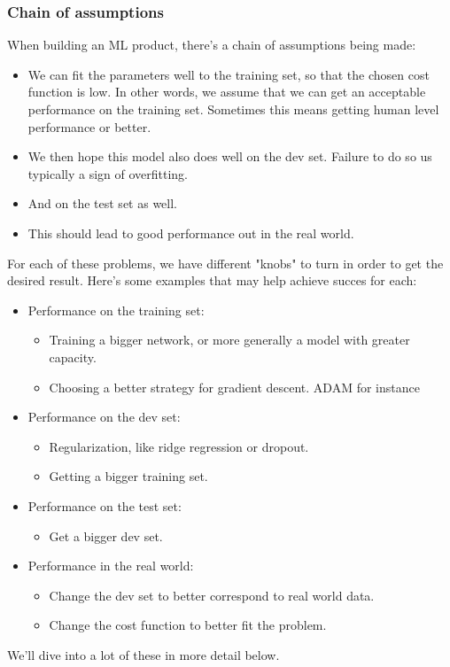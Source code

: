 \documentclass[12pt, a4paper]{article}
\numberwithin{equation}{section}
\begin{document}
\subsubsection{Chain of assumptions}
When building an ML product, there's a chain of assumptions being made:
\begin{itemize}
\item We can fit the parameters well to the training set, so that the chosen cost function is low. In other words, we assume that we can get an acceptable performance on the training set. Sometimes this means getting human level performance or better.
\item We then hope this model also does well on the dev set. Failure to do so us typically a sign of overfitting.
\item And on the test set as well.
\item This should lead to good performance out in the real world.
\end{itemize}
For each of these problems, we have different "knobs" to turn in order to get the desired result. Here's some examples that may help achieve succes for each:
\begin{itemize}
\item Performance on the training set:
	\begin{itemize}
	\item Training a bigger network, or more generally a model with greater capacity.
	\item Choosing a better strategy for gradient descent. ADAM for instance
	\end{itemize}
\item Performance on the dev set:
	\begin{itemize}
	\item Regularization, like ridge regression or dropout.
	\item Getting a bigger training set.
	\end{itemize}
\item Performance on the test set:
	\begin{itemize}
	\item Get a bigger dev set.
	\end{itemize}
\item Performance in the real world:
	\begin{itemize}
	\item Change the dev set to better correspond to real world data.
	\item Change the cost function to better fit the problem.
	\end{itemize}
\end{itemize}
We'll dive into a lot of these in more detail below.
\end{document}
